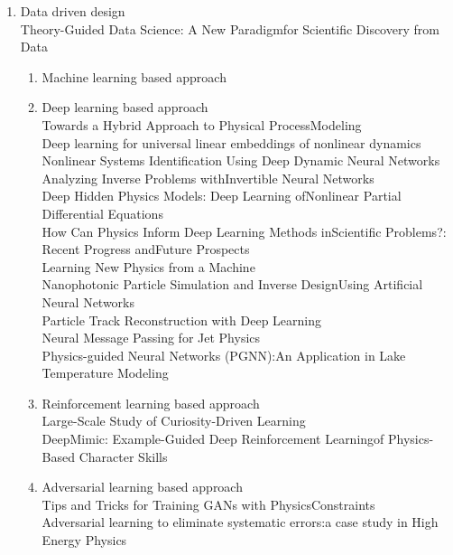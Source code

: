 \documentclass{article}
\begin{document}
\begin{enumerate}
  \item Data driven design \\
  Theory-Guided Data Science: A New Paradigmfor Scientific Discovery from Data \\
  \begin{enumerate}
    \item Machine learning based approach \\
    \item Deep learning based approach \\
      Towards a Hybrid Approach to Physical ProcessModeling \\
      Deep learning for universal linear embeddings of nonlinear dynamics \\
      Nonlinear Systems Identification Using Deep Dynamic Neural Networks \\
      Analyzing Inverse Problems withInvertible Neural Networks \\
      Deep Hidden Physics Models:  Deep Learning ofNonlinear Partial Differential Equations \\
      How Can Physics Inform Deep Learning Methods inScientific Problems?: Recent Progress andFuture Prospects \\
      Learning New Physics from a Machine \\
      Nanophotonic Particle Simulation and Inverse DesignUsing Artificial Neural Networks \\
      Particle Track Reconstruction with Deep Learning \\
      Neural Message Passing for Jet Physics \\
      Physics-guided Neural Networks (PGNN):An Application in Lake Temperature Modeling \\
    \item Reinforcement learning based approach \\
      Large-Scale Study of Curiosity-Driven Learning \\
      DeepMimic: Example-Guided Deep Reinforcement Learningof Physics-Based Character Skills \\
    \item Adversarial learning based approach \\
      Tips and Tricks for Training GANs with PhysicsConstraints \\
      Adversarial learning to eliminate systematic errors:a case study in High Energy Physics \\
  \end{enumerate}

\end{enumerate}
\end{document}
